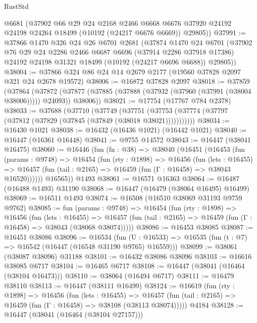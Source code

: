 \begin{lexlean}{RustStd}
\begin{coremodule}
      @6681
      (@37902
        @66
        @29
        @24
        @2168
        @2466
        @6668
        @6676
        @37920
        @24192
        @24198
        @24264
        @18499
        (@10192 (@24217 @6676 @6669))
        @29805))
@37991 := @37866
    @1470
    @326
    @24
    @26
    @6701
    @2681
    (@37874
      @1470
      @24
      @6701
      (@37902
        @76
        @29
        @24
        @2286
        @2466
        @6687
        @6696
        (@37914 @2286 @37918 @17386)
        @24192
        @24198
        @31321
        @18499
        (@10192 (@24217 @6696 @6688))
        @29805))
@38004 := @37866 @324 @86 @24 @14 @2679 @2177 (@19560 @37828 @2097 @321 @24 @2678 @19572)
@38006 := @16872 @37828 @2097
@38018 := @37859
    (@37864
      (@37872 (@37877 (@37885 (@37888 (@37932 (@37960 (@37991 (@38004 @38006))))) @24093)) @38006))
@38021 := @17754 (@17767 @784 @2378)
@38033 := @37688
    (@37710
      (@37749
        (@37751 (@37753 (@37774 (@37797 (@37812 (@37829 (@37845 (@37849 (@38018 @38021)))))))))))
@38034 := @16430 @1021
@38038 := @16432 (@16436 @1021) (@16442 @1021)
@38040 := @16447 (@16361 @16448)
@38041 := @9755 @14572
@38043 := @16447 (@38041 @16475)
@38060 := @16446
    (fun (fn : @38) =>
    @38040
      (@16451
        (@16453
          (fun (params : @9748) =>
          @16454
            (fun (rty : @1898) =>
            @16456
              (fun (lets : @16455) =>
              @16457 (fun (tail : @2165) => @16459 (fun (Γ : @16458) => @38043 @16520))))))
        @16565))
    @1493
@38061 := @16571 @16363
@38064 := @16487 (@16488 @1493) @31190
@38068 := @16447 (@16479 (@38064 @16495) @16499)
@38069 := @16511 @1493
@38074 := @16508 (@16510 @38069 @31193 @9759 @9762)
@38085 := fun (params : @9748) =>
  @16454
    (fun (rty : @1898) =>
    @16456
      (fun (lets : @16455) =>
      @16457 (fun (tail : @2165) => @16459 (fun (Γ : @16458) => @38043 (@38068 @38074)))))
@38086 := @16453 @38085
@38087 := @16451 @38086
@38096 := @16534
    (fun (U : @16533) => @16535 (fun (t : @7) => @16542 (@16447 (@16548 @31190 @9765) @16559)))
@38099 := @38061 (@38087 @38096) @31188
@38101 := @16432 @38086 @38096
@38103 := @16616 @38085 @6717
@38104 := @16465 @6717
@38108 := @16447 (@38041 (@16464 (@38104 @16473)))
@38110 := @38064 (@16494 @6717)
@38111 := @16479 @38110
@38113 := @16447 (@38111 @16499)
@38124 := @16619
    (fun (rty : @1898) =>
    @16456
      (fun (lets : @16455) =>
      @16457 (fun (tail : @2165) => @16459 (fun (Γ : @16458) => @38108 (@38113 @38074)))))
    @4184
@38128 := @16447 (@38041 (@16464 (@38104 @27157)))

\end{coremodule}
\end{lexlean}
